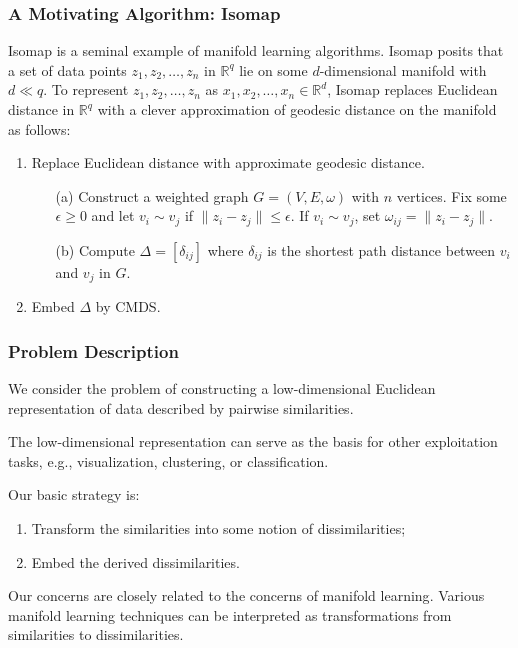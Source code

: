 \documentclass[professionalfonts, hyperref={pdfpagelabels=false,
  colorlinks=true, linkcolor=purple}]{beamer}
\begin{document}
\begin{frame}
  \frametitle{A Motivating Algorithm: Isomap} 
  Isomap \cite{tenebaum00:_global_geomet_framew_nonlin_dimen_reduc} is
  a seminal example of manifold learning algorithms. Isomap posits that
  a set of data points $z_1, z_2, \dots, z_n$ in $\mathbb{R}^{q}$ lie
  on some $d$-dimensional manifold with $d \ll q$. To represent $z_1, z_2,
  \dots, z_n$ as $x_1, x_2, \dots, x_n \in \mathbb{R}^{d}$, Isomap
  replaces Euclidean distance in $\mathbb{R}^{q}$ with a clever
  approximation of geodesic distance on the manifold as follows:
  \vskip10pt
  \begin{enumerate}
  \item Replace Euclidean distance with approximate geodesic
    distance.
    \begin{enumerate}
    \item[(a)] Construct a weighted graph $G = (V,E,\omega)$ with $n$
      vertices. Fix some $\epsilon \geq 0$ and let $v_i \sim v_j$ if 
      $\|z_i - z_j\| \leq \epsilon$. If $v_i \sim v_j$, set
      $\omega_{ij} = \|z_i - z_j\|$.
    \item[(b)] Compute $\Delta = [\delta_{ij}]$ where
      $\delta_{ij}$ is the shortest path distance between $v_i$ and
      $v_j$ in $G$.
    \end{enumerate}
   \item Embed $\Delta$ by CMDS.
  \end{enumerate}
\end{frame}

\begin{frame}
  \frametitle{Problem Description}
  We consider the problem of constructing a low-dimensional Euclidean
  representation of data described by pairwise similarities. 
  
 \vskip10pt The low-dimensional representation can serve as the basis
 for other exploitation tasks, e.g., visualization, clustering, or 
 classification.  
 
 \vskip10pt Our basic strategy is:

  \begin{enumerate}
  \item Transform the similarities into some notion of dissimilarities;
  \item Embed the derived dissimilarities.
  \end{enumerate}
  
  Our concerns are closely related to the concerns of \alert{manifold
    learning}. Various manifold learning techniques can be interpreted
  as transformations from similarities to dissimilarities.
\end{frame}
\end{document}
